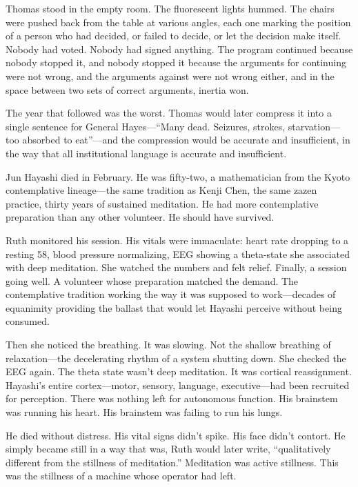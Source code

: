 Thomas stood in the empty room. The fluorescent lights hummed. The chairs were pushed back from the table at various angles, each one marking the position of a person who had decided, or failed to decide, or let the decision make itself. Nobody had voted. Nobody had signed anything. The program continued because nobody stopped it, and nobody stopped it because the arguments for continuing were not wrong, and the arguments against were not wrong either, and in the space between two sets of correct arguments, inertia won.

\scenebreak

The year that followed was the worst. Thomas would later compress it into a single sentence for General Hayes---``Many dead. Seizures, strokes, starvation---too absorbed to eat''---and the compression would be accurate and insufficient, in the way that all institutional language is accurate and insufficient.

Jun Hayashi died in February. He was fifty-two, a mathematician from the Kyoto contemplative lineage---the same tradition as Kenji Chen, the same zazen practice, thirty years of sustained meditation. He had more contemplative preparation than any other volunteer. He should have survived.

Ruth monitored his session. His vitals were immaculate: heart rate dropping to a resting 58, blood pressure normalizing, EEG showing a theta-state she associated with deep meditation. She watched the numbers and felt relief. Finally, a session going well. A volunteer whose preparation matched the demand. The contemplative tradition working the way it was supposed to work---decades of equanimity providing the ballast that would let Hayashi perceive without being consumed.

Then she noticed the breathing. It was slowing. Not the shallow breathing of relaxation---the decelerating rhythm of a system shutting down. She checked the EEG again. The theta state wasn't deep meditation. It was cortical reassignment. Hayashi's entire cortex---motor, sensory, language, executive---had been recruited for perception. There was nothing left for autonomous function. His brainstem was running his heart. His brainstem was failing to run his lungs.

He died without distress. His vital signs didn't spike. His face didn't contort. He simply became still in a way that was, Ruth would later write, ``qualitatively different from the stillness of meditation.'' Meditation was active stillness. This was the stillness of a machine whose operator had left.

